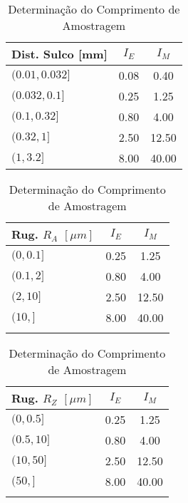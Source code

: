 \documentclass{article}
\begin{document}
                \begin{table}[H]
                    \centering
                    \begin{tabular}[]{l | c c}\hline
                        Dist. Sulco [mm] & $I_{E}$ & $I_{M}$\\\hline
                        $(0.01, 0.032]$  & 0.08    & 0.40\\
                        $(0.032,  0.1]$  & 0.25    & 1.25\\
                        $(0.1,   0.32]$  & 0.80    & 4.00\\
                        $(0.32,     1]$  & 2.50    & 12.50\\
                        $(1,      3.2]$  & 8.00    & 40.00\\\hline
                    \end{tabular}
                    \hspace{5mm}
                    \begin{tabular}[]{l | c c}\hline
                        Rug. $R_{A}$ $[\mu m]$ & $I_{E}$ & $I_{M}$\\\hline
                        $(0,  0.1]$            & 0.25    & 1.25\\
                        $(0.1,  2]$            & 0.80    & 4.00\\
                        $(2,   10]$            & 2.50    & 12.50\\
                        $(10,    ]$            & 8.00    & 40.00\\
                                               &         & \\\hline
                    \end{tabular}
                    \hspace{5mm}
                    \begin{tabular}[]{l | c c}\hline
                        Rug. $R_{Z}$ $[\mu m]$ & $I_{E}$ & $I_{M}$\\\hline
                        $(0,  0.5]$            & 0.25    & 1.25\\
                        $(0.5, 10]$            & 0.80    & 4.00\\
                        $(10,  50]$            & 2.50    & 12.50\\
                        $(50,    ]$            & 8.00    & 40.00\\
                                               &         & \\\hline
                    \end{tabular}
                    \caption{Determinação do Comprimento de Amostragem}
                \end{table}
\end{document}

